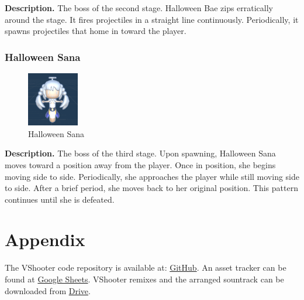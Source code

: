 \documentclass[10pt, a4paper]{article}
\begin{document}
\begin{multicols}{2}
	\textbf{Description.} The boss of the second stage. Halloween Bae zips erratically around the stage. It fires projectiles in a straight line continuously. Periodically, it spawns projectiles that home in toward the player.

	\subsubsection{Halloween Sana}

	\begin{figure}[H]
		\centering
		\includegraphics[width=0.2\textwidth]{images/halloween_sana1.png}
		\caption{Halloween Sana}
		\label{fig:halloweensana}
	\end{figure}

	\textbf{Description.} The boss of the third stage. Upon spawning, Halloween Sana moves toward a position away from the player. Once in position, she begins moving side to side. Periodically, she approaches the player while still moving side to side. After a brief period, she moves back to her original position. This pattern continues until she is defeated.

	\section{Appendix}

	The VShooter code repository is available at: \href{https://github.com/giociudadano/VShooter.git}{GitHub}. An asset tracker can be found at \href{https://docs.google.com/spreadsheets/d/1iixa0Slci229xnzVG4J9bXTK8P0FVPwnDIEXkRsuH7s/edit?usp=sharing}{Google Sheets}. VShooter remixes and the arranged sountrack can be downloaded from \href{https://drive.google.com/drive/folders/1lVz1maZ6dL9_K4PAbTF3IGDHxGWFrajg?usp=drive_link}{Drive}.

	\end{multicols}
\end{document}
